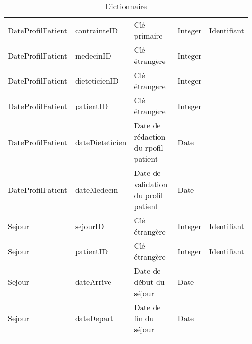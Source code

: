\begin{longtable}{llp{5cm}ll}
  DateProfilPatient & contrainteID & Clé primaire & Integer & Identifiant \\
  DateProfilPatient & medecinID & Clé étrangère & Integer & \\
  DateProfilPatient & dieteticienID & Clé étrangère & Integer & \\
  DateProfilPatient & patientID & Clé étrangère & Integer & \\
  DateProfilPatient & dateDieteticien & Date de rédaction du rpofil patient & Date & \\
  DateProfilPatient & dateMedecin & Date de validation du profil patient & Date & \\ \hline

  Sejour & sejourID & Clé étrangère & Integer & Identifiant \\
  Sejour & patientID & Clé étrangère & Integer & Identifiant \\
  Sejour & dateArrive & Date de début du séjour & Date & \\
  Sejour & dateDepart & Date de fin du séjour & Date & \\ \hline

\caption{Dictionnaire}
\label{DictionnaireMDD}
\end{longtable}
